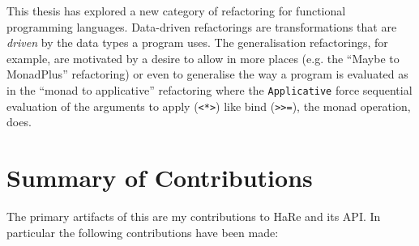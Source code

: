 \DIFdelend This thesis has explored a new category of refactoring for functional programming languages. Data-driven refactorings are transformations that are \textit{driven} by the data types a program uses. The generalisation refactorings, for example, are motivated by a desire to allow \DIFdelbegin {}\DIFdelend \DIFaddbegin {}\DIFaddend in more places (e.g. the ``Maybe to MonadPlus'' refactoring) or even to generalise the way a program is evaluated as in the ``monad to applicative'' refactoring where the \texttt{Applicative} \DIFdelbegin {}\DIFdelend \DIFaddbegin {}\DIFaddend force sequential evaluation of the arguments to apply (\texttt{<*>}) like bind (\texttt{>>=}), the monad operation, does.

\DIFaddbegin {}

\section{Summary of Contributions}

\DIFaddend The primary artifacts of this \DIFdelbegin {}\DIFdelend \DIFaddbegin {}\DIFaddend are my contributions to HaRe and its API. In particular the following contributions have been made:

